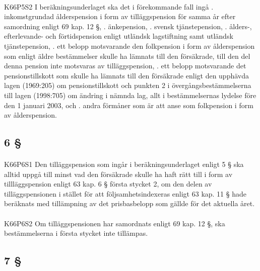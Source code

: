 \documentclass[a4paper,notitlepage,openany,10pt]{book}
\begin{document}
\paragraph*{}
{\tiny K66P5S2}
I beräkningsunderlaget ska det i förekommande fall ingå
. inkomstgrundad ålderspension i form av tilläggspension för samma år efter samordning enligt 69 kap. 12 §,
. änkepension,
. svensk tjänstepension,
. ålders-, efterlevande- och förtidspension enligt utländsk lagstiftning samt utländsk tjänstepension,
. ett belopp motsvarande den folkpension i form av ålderspension som enligt äldre bestämmelser skulle ha lämnats till den försäkrade, till den del denna pension inte motsvaras av tilläggspension,
. ett belopp motsvarande det pensionstillskott som skulle ha lämnats till den försäkrade enligt den upphävda lagen (1969:205) om pensionstillskott och punkten 2 i övergångsbestämmelserna till lagen (1998:705) om ändring i nämnda lag, allt i bestämmelsernas lydelse före den 1 januari 2003, och
. andra förmåner som är att anse som folkpension i form av ålderspension.
\subsection*{6 §}
\paragraph*{}
{\tiny K66P6S1}
Den tilläggspension som ingår i beräkningsunderlaget enligt 5 § ska alltid uppgå till minst vad den försäkrade skulle ha haft rätt till i form av tillläggspension enligt 63 kap. 6 § första stycket 2, om den delen av tilläggspensionen i stället för att följsamhetsindexeras enligt 63 kap. 11 § hade beräknats med tillämpning av det prisbasbelopp som gällde för det aktuella året.
\paragraph*{}
{\tiny K66P6S2}
Om tilläggspensionen har samordnats enligt 69 kap. 12 §, ska bestämmelserna i första stycket inte tillämpas.
\subsection*{7 §}
\end{document}
